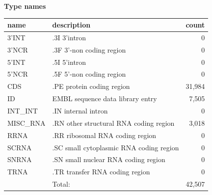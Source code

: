 \documentclass{article}
\begin{document}
\begin{Schunk}
\textbf{Type names}
\noindent\begin{tabular}{llr}
\hline \hline
name & description & count \\
\hline
3'INT  &  .3I 3'intron  &  0 \\
3'NCR  &  .3F  3'-non coding region  &  0 \\
5'INT  &  .5I 5'intron  &  0 \\
5'NCR  &  .5F  5'-non coding region  &  0 \\
CDS  &  .PE protein coding region  &  31,984 \\
ID  &  EMBL sequence data library entry  &  7,505 \\
INT\_INT  &  .IN  internal intron  &  0 \\
MISC\_RNA  &  .RN other structural RNA coding region  &  3,018 \\
RRNA  &  .RR ribosomal RNA coding region  &  0 \\
SCRNA  &  .SC small cytoplasmic RNA coding region  &  0 \\
SNRNA  &  .SN small nuclear RNA coding region  &  0 \\
TRNA  &  .TR transfer RNA coding region  &  0 \\
\hline
 & Total: & 42,507 \\
\hline \hline
\end{tabular}


\end{Schunk}
\end{document}
